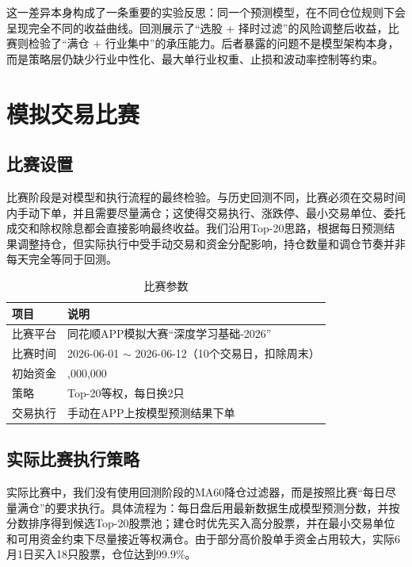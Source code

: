 \documentclass[10pt,a4paper]{ctexart}
\begin{document}
这一差异本身构成了一条重要的实验反思：同一个预测模型，在不同仓位规则下会呈现完全不同的收益曲线。回测展示了“选股 + 择时过滤”的风险调整后收益，比赛则检验了“满仓 + 行业集中”的承压能力。后者暴露的问题不是模型架构本身，而是策略层仍缺少行业中性化、最大单行业权重、止损和波动率控制等约束。

\section{模拟交易比赛}

\subsection{比赛设置}

比赛阶段是对模型和执行流程的最终检验。与历史回测不同，比赛必须在交易时间内手动下单，并且需要尽量满仓；这使得交易执行、涨跌停、最小交易单位、委托成交和除权除息都会直接影响最终收益。我们沿用Top-20思路，根据每日预测结果调整持仓，但实际执行中受手动交易和资金分配影响，持仓数量和调仓节奏并非每天完全等同于回测。

\begin{table}[htbp]
    \centering
    \caption{比赛参数}
    \begin{tabular}{ll}
        \toprule
        项目 & 说明 \\
        \midrule
        比赛平台 & 同花顺APP模拟大赛“深度学习基础-2026” \\
        比赛时间 & 2026-06-01 $\sim$ 2026-06-12（10个交易日，扣除周末） \\
        初始资金 & \yen1,000,000 \\
        策略 & Top-20等权，每日换2只 \\
        交易执行 & 手动在APP上按模型预测结果下单 \\
        \bottomrule
    \end{tabular}
\end{table}

\subsection{实际比赛执行策略}

实际比赛中，我们没有使用回测阶段的MA60降仓过滤器，而是按照比赛“每日尽量满仓”的要求执行。具体流程为：每日盘后用最新数据生成模型预测分数，并按分数排序得到候选Top-20股票池；建仓时优先买入高分股票，并在最小交易单位和可用资金约束下尽量接近等权满仓。由于部分高价股单手资金占用较大，实际6月1日买入18只股票，仓位达到99.9\%。
\end{document}
